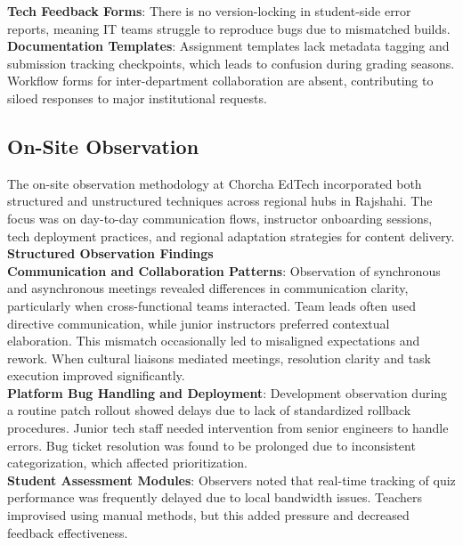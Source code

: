 \documentclass[12pt,a4paper,oneside]{book}
\begin{document}
\textbf{Tech Feedback Forms}: There is no version-locking in student-side error reports, meaning IT teams struggle to reproduce bugs due to mismatched builds.\\

\textbf{Documentation Templates}: Assignment templates lack metadata tagging and submission tracking checkpoints, which leads to confusion during grading seasons. Workflow forms for inter-department collaboration are absent, contributing to siloed responses to major institutional requests.\\


\subsection{On-Site Observation}

The on-site observation methodology at Chorcha EdTech incorporated both structured and unstructured techniques across regional hubs in Rajshahi. The focus was on day-to-day communication flows, instructor onboarding sessions, tech deployment practices, and regional adaptation strategies for content delivery.\\

\textbf{Structured Observation Findings} \\

\textbf{Communication and Collaboration Patterns}: Observation of synchronous and asynchronous meetings revealed differences in communication clarity, particularly when cross-functional teams interacted. Team leads often used directive communication, while junior instructors preferred contextual elaboration. This mismatch occasionally led to misaligned expectations and rework. When cultural liaisons mediated meetings, resolution clarity and task execution improved significantly.\\

\textbf{Platform Bug Handling and Deployment}: Development observation during a routine patch rollout showed delays due to lack of standardized rollback procedures. Junior tech staff needed intervention from senior engineers to handle errors. Bug ticket resolution was found to be prolonged due to inconsistent categorization, which affected prioritization.\\

\textbf{Student Assessment Modules}: Observers noted that real-time tracking of quiz performance was frequently delayed due to local bandwidth issues. Teachers improvised using manual methods, but this added pressure and decreased feedback effectiveness.\\
\end{document}

